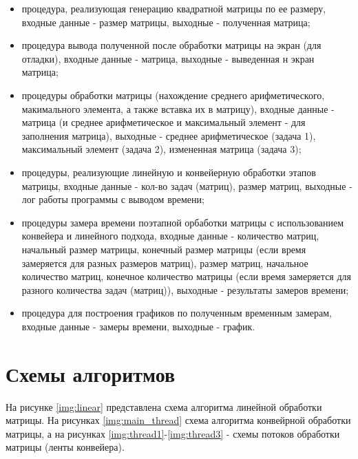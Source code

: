 \begin{itemize}
	\item процедура, реализующая генерацию квадратной матрицы по ее размеру, входные данные - размер матрицы, выходные - полученная матрица;
	\item процедура вывода полученной после обработки матрицы на экран (для отладки), входные данные - матрица, выходные - выведенная н экран матрица;
	\item процедуры обработки матрицы (нахождение среднего арифметического, макимального элемента, а также вставка их в матрицу), входные данные - матрица (и среднее арифметическое и максимальный элемент - для заполнения матрица), выходные - среднее арифметическое (задача 1), максимальный элемент (задача 2), измененная матрица (задача 3);
	\item процедуры, реализующие линейную и конвейерную обработки этапов матрицы, входные данные - кол-во задач (матриц), размер матриц, выходные - лог работы программы с выводом времени; 
	\item процедуры замера времени поэтапной орбаботки матрицы с использованием конвейера и линейного подхода, входные данные - количество матриц, начальный размер матрицы, конечный размер матрицы (если время замеряется для разных размеров матриц), размер матриц, начальное количество матриц, конечное количество матрицы (если время замеряется для разного количества задач (матриц)), выходные - результаты замеров времени;
	\item процедура для построения графиков по полученным временным замерам, входные данные - замеры времени, выходные - график.
\end{itemize}


\section{Схемы алгоритмов}
На рисунке \ref{img:linear} представлена схема алгоритма линейной обработки матрицы. На рисунках \ref{img:main_thread} схема алгоритма конвейрной обработки матрицы, а на рисунках \ref{img:thread1}-\ref{img:thread3} - схемы потоков обработки матрицы (ленты конвейера).



